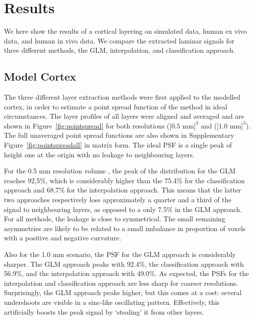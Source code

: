 \section{Results}
We here show the results of a cortical layering on simulated data, human ex vivo data, and human in vivo data. We compare the extracted laminar signals for three different methods, the GLM, interpolation, and classification approach.

\subsection{Model Cortex}
The three different layer extraction methods were first applied to the modelled cortex, in order to estimate a point spread function of the method in ideal circumstances. The layer profiles of all layers were aligned and averaged  and are shown in Figure~\ref{fig:pointspread} for both resolutions ($[0.5 $ mm$]^3$ and ($[1.0 $ mm$]^3$). The full unaveraged point spread functions are also shown in Supplementary Figure~\ref{fig:pointspreadall} in matrix form. The ideal PSF is a single peak of height one at the origin with no leakage to neighbouring layers.


For the 0.5 mm resolution volume , the peak of the distribution for the GLM reaches 92,5\%, which is considerably higher than the 75.4\% for the classification approach and 68,7\% for the interpolation approach. This means that the latter two approaches respectively lose approximately a quarter and a third of the signal to neighbouring layers, as opposed to a only 7.5\% in the GLM approach. For all methods, the leakage is close to symmetrical. The small remaining asymmetries are likely to be related to a small imbalance in proportion of voxels with a positive and negative curvature.

Also for the 1.0 mm scenario, the PSF for the GLM approach is considerably sharper. The GLM approach peaks with 92.4\%, the classification approach with 56.9\%, and the interpolation approach with 49.0\%. As expected, the PSFs for the interpolation and classification approach are less sharp for coarser resolutions. Surprisingly, the GLM approach peaks higher, but this comes at a cost: several undershoots are visible in a sinc-like oscillating pattern. Effectively, this artificially boosts the peak signal by `stealing' it from other layers. 

